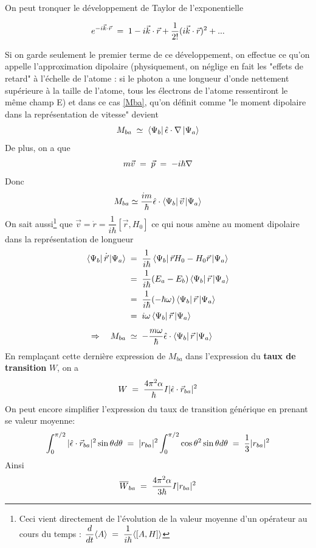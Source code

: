 On peut tronquer le développement de Taylor de l'exponentielle

\begin{equation}
    e^{-i\vec{k}\cdot\vec{r}}\; = \; 1-i\vec{k}\cdot\vec{r}+\dfrac{1}{2!}(i\vec{k}\cdot\vec{r})^2+...
    \label{eq:dvpl_expo}
\end{equation}

Si on garde seulement le premier terme de ce développement, on effectue ce qu'on appelle l'approximation dipolaire (physiquement, on néglige en fait les "effets de retard" à l'échelle de l'atome : si le photon a une longueur d'onde nettement supérieure à la taille de l'atome, tous les électrons de l'atome ressentiront le même champ E) et dans ce cas \eqref{Mba}, qu'on définit comme "le moment dipolaire dans la représentation de vitesse" devient
\begin{equation*}
    M_{ba} \;\simeq\; \bra{\Psi_b}\hat{\epsilon}\cdot\nabla\ket{\Psi_a}
\end{equation*}
De plus, on a que 
\begin{equation*}
    m\vec{v}\; = \; \vec{p}\; = \; -i\hbar \nabla
\end{equation*}
Donc
\begin{equation*}
    M_{ba} \simeq \dfrac{im}{\hbar}\hat{\epsilon}\cdot\bra{\Psi_b}\vec{v}\ket{\Psi_a}
\end{equation*}
On sait aussi\footnote{Ceci vient directement de l'évolution de la valeur moyenne d'un opérateur au cours du temps : $\dfrac{d}{dt}\langle A \rangle \; = \; \dfrac{1}{i\hbar}\langle[A,H] \rangle$} que $\vec{v}=\dot{r}=\dfrac{1}{i\hbar}[\vec{r},H_0]$ ce qui nous amène au moment dipolaire dans la représentation de longueur
\begin{align*}
    \bra{\Psi_b}\dot{\vec{r}}\ket{\Psi_a}
    &\; = \; 
    \dfrac{1}{i\hbar}\bra{\Psi_b}\vec{r}H_0-H_0\vec{r}\ket{\Psi_a}\\
    &\; = \; 
    \dfrac{1}{i\hbar}(E_a-E_b)\bra{\Psi_b}\vec{r}\ket{\Psi_a}\\
    &\; = \; 
    \dfrac{1}{i\hbar}(-\hbar \omega)\bra{\Psi_b}\vec{r}\ket{\Psi_a} \\
    &\; = \;  
    i \omega \bra{\Psi_b}\vec{r}\ket{\Psi_a} \\[5pt]
    \Rightarrow \quad M_{ba} &\;\simeq\; 
    -\dfrac{m \omega}{\hbar}\hat{\epsilon}\cdot\bra{\Psi_b}\vec{r}\ket{\Psi_a}
\end{align*}
En remplaçant cette dernière expression de $M_{ba}$ dans l'expression du \textbf{taux de transition} $W$, on a 
\begin{equation*}
    W\; = \; \dfrac{4\pi^2 \alpha}{\hbar}I |\hat{\epsilon}\cdot\vec{r}_{ba}|^2
\end{equation*}
On peut encore simplifier l'expression du taux de transition générique en prenant se valeur moyenne:
\begin{equation*}
    \int_{0}^{\pi/2} |\hat{\epsilon}\cdot\vec{r}_{ba}|^2\sin{\theta} d\theta\; = \; |r_{ba}|^2\int_{0}^{\pi/2}\cos{\theta}^2\sin{\theta}d\theta\; = \; \dfrac{1}{3}|r_{ba}|^2
\end{equation*}
Ainsi
\begin{equation}
    \overline{W}_{ba}\; = \; \dfrac{4\pi^2 \alpha}{3 \hbar}I |r_{ba}|^2
\end{equation}



